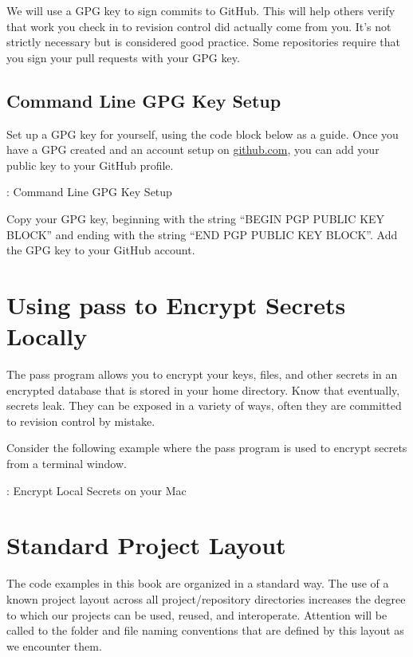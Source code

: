 \justifying
We will use a GPG key to sign commits to GitHub. This will help others verify that work you check in to revision
control did actually come from you. It's not strictly necessary but is considered good practice.
Some repositories require that you sign your pull requests with your GPG key.

\subsection{Command Line GPG Key Setup}

\justifying
Set up a GPG key for yourself, using the code block below as a guide. Once you have a GPG created and an account setup
on \href{github.com}{github.com}, you can add your public key to your GitHub profile.

\begin{mybox}{\thetcbcounter: Command Line GPG Key Setup}

\end{mybox}

\justifying
Copy your GPG key, beginning with the string ``BEGIN PGP PUBLIC KEY BLOCK'' and ending with the string
``END PGP PUBLIC KEY BLOCK''. Add the GPG key to your GitHub account.

\section{Using pass to Encrypt Secrets Locally}

\justifying
The pass program allows you to encrypt your keys, files, and other secrets in an encrypted database that is
stored in your home directory. Know that eventually, secrets leak. They can be exposed in a variety of ways, 
often they are committed to revision control by mistake.

\justifying
Consider the following example where the pass program is used to encrypt secrets from a terminal window.

\begin{mybox}{\thetcbcounter: Encrypt Local Secrets on your Mac}

\end{mybox}

\section{Standard Project Layout}

\justifying
The code examples in this book are organized in a standard way. The use of a known project 
layout across all project/repository directories increases the degree to which our projects can be used, reused, and
interoperate. Attention will be called to the folder and file naming conventions that are defined by this layout
as we encounter them.

